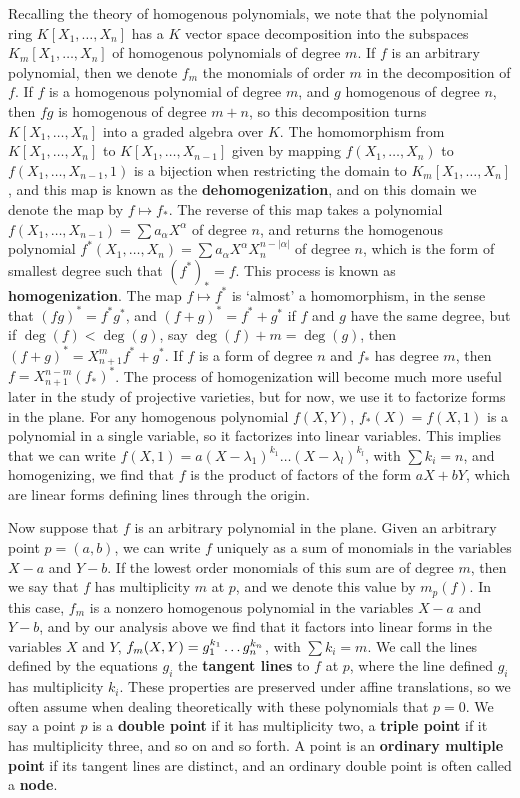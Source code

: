 Recalling the theory of homogenous polynomials, we note that the polynomial ring $K[X_1, \dots, X_n]$ has a $K$ vector space decomposition into the subspaces $K_m[X_1, \dots, X_n]$ of homogenous polynomials of degree $m$. If $f$ is an arbitrary polynomial, then we denote $f_m$ the monomials of order $m$ in the decomposition of $f$. If $f$ is a homogenous polynomial of degree $m$, and $g$ homogenous of degree $n$, then $fg$ is homogenous of degree $m + n$, so this decomposition turns $K[X_1, \dots, X_n]$ into a graded algebra over $K$. The homomorphism from $K[X_1, \dots, X_n]$ to $K[X_1, \dots, X_{n-1}]$ given by mapping $f(X_1, \dots, X_n)$ to $f(X_1,\dots,X_{n-1},1)$ is a bijection when restricting the domain to $K_m[X_1, \dots, X_n]$, and this map is known as the {\bf dehomogenization}, and on this domain we denote the map by $f \mapsto f_*$. The reverse of this map takes a polynomial $f(X_1, \dots, X_{n-1}) = \sum a_\alpha X^\alpha$ of degree $n$, and returns the homogenous polynomial $f^*(X_1, \dots, X_n) = \sum a_\alpha X^\alpha X_n^{n-|\alpha|}$ of degree $n$, which is the form of smallest degree such that $(f^*)_* = f$. This process is known as {\bf homogenization}. The map $f \mapsto f^*$ is `almost' a homomorphism, in the sense that $(fg)^* = f^*g^*$, and $(f + g)^* = f^* + g^*$ if $f$ and $g$ have the same degree, but if $\deg(f) < \deg(g)$, say $\deg(f) + m = \deg(g)$, then $(f + g)^* = X_{n+1}^m f^* + g^*$. If $f$ is a form of degree $n$ and $f_*$ has degree $m$, then $f = X_{n+1}^{n-m} (f_*)^*$. The process of homogenization will become much more useful later in the study of projective varieties, but for now, we use it to factorize forms in the plane. For any homogenous polynomial $f(X,Y)$, $f_*(X) = f(X,1)$ is a polynomial in a single variable, so it factorizes into linear variables. This implies that we can write $f(X,1) = a(X-\lambda_1)^{k_1} \dots (X - \lambda_l)^{k_l}$, with $\sum k_i = n$, and homogenizing, we find that $f$ is the product of factors of the form $aX + bY$, which are linear forms defining lines through the origin.

Now suppose that $f$ is an arbitrary polynomial in the plane. Given an arbitrary point $p = (a,b)$, we can write $f$ uniquely as a sum of monomials in the variables $X-a$ and $Y-b$. If the lowest order monomials of this sum are of degree $m$, then we say that $f$ has multiplicity $m$ at $p$, and we denote this value by $m_p(f)$. In this case, $f_m$ is a nonzero homogenous polynomial in the variables $X-a$ and $Y-b$, and by our analysis above we find that it factors into linear forms in the variables $X$ and $Y$, $f_m(X,Y) = \smash{g_1^{k_1} \dots g_n^{k_n}}$, with $\sum k_i = m$. We call the lines defined by the equations $g_i$ the {\bf tangent lines} to $f$ at $p$, where the line defined $g_i$ has multiplicity $k_i$. These properties are preserved under affine translations, so we often assume when dealing theoretically with these polynomials that $p = 0$. We say a point $p$ is a {\bf double point} if it has multiplicity two, a {\bf triple point} if it has multiplicity three, and so on and so forth. A point is an {\bf ordinary multiple point} if its tangent lines are distinct, and an ordinary double point is often called a {\bf node}.

